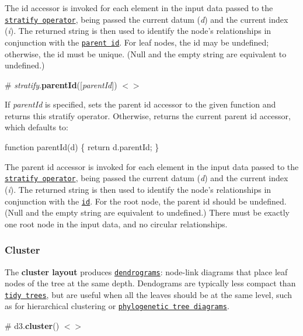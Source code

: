 The id accessor is invoked for each element in the input data passed to the \href{#_stratify}{\tt stratify operator}, being passed the current datum ({\itshape d}) and the current index ({\itshape i}). The returned string is then used to identify the node’s relationships in conjunction with the \href{#stratify_parentId}{\tt parent id}. For leaf nodes, the id may be undefined; otherwise, the id must be unique. (Null and the empty string are equivalent to undefined.)

\label{_stratify_parentId}%
\# {\itshape stratify}.{\bfseries parent\+Id}(\mbox{[}{\itshape parent\+Id}\mbox{]}) \href{https://github.com/d3/d3-hierarchy/blob/master/src/stratify.js#L68}{\tt $<$$>$}

If {\itshape parent\+Id} is specified, sets the parent id accessor to the given function and returns this stratify operator. Otherwise, returns the current parent id accessor, which defaults to\+:


\begin{DoxyCode}
function parentId(d) \{
  return d.parentId;
\}
\end{DoxyCode}


The parent id accessor is invoked for each element in the input data passed to the \href{#_stratify}{\tt stratify operator}, being passed the current datum ({\itshape d}) and the current index ({\itshape i}). The returned string is then used to identify the node’s relationships in conjunction with the \href{#stratify_id}{\tt id}. For the root node, the parent id should be undefined. (Null and the empty string are equivalent to undefined.) There must be exactly one root node in the input data, and no circular relationships.

\subsubsection*{Cluster}

\href{http://bl.ocks.org/mbostock/ff91c1558bc570b08539547ccc90050b}{\tt }

The {\bfseries cluster layout} produces \href{http://en.wikipedia.org/wiki/Dendrogram}{\tt dendrograms}\+: node-\/link diagrams that place leaf nodes of the tree at the same depth. Dendograms are typically less compact than \href{#tree}{\tt tidy trees}, but are useful when all the leaves should be at the same level, such as for hierarchical clustering or \href{http://bl.ocks.org/mbostock/c034d66572fd6bd6815a}{\tt phylogenetic tree diagrams}.

\label{_cluster}%
\# d3.{\bfseries cluster}() \href{https://github.com/d3/d3-hierarchy/blob/master/src/cluster.js}{\tt $<$$>$}

